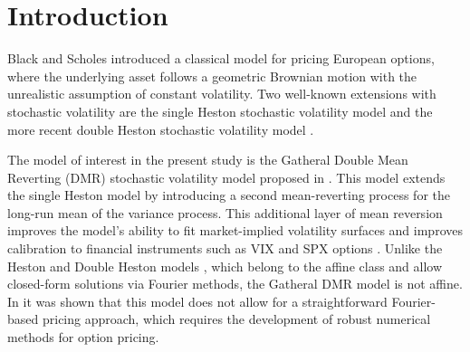 \documentclass[graybox]{svmult}
\begin{document}










\section{Introduction}
Black and Scholes \cite{black1973pricing} introduced a classical model for pricing European options, where the underlying asset follows a geometric Brownian motion with the unrealistic assumption of constant volatility. Two well-known extensions with stochastic volatility are the single Heston stochastic volatility \cite{heston1993closed} model and the more recent double Heston stochastic volatility model  \cite{christoffersen2009shape}. 

The model of interest in the present study is the Gatheral Double Mean Reverting (DMR) stochastic volatility model proposed in \cite{gatheral2008consistent}. This model extends the single Heston model by introducing a second mean-reverting process for the long-run mean of the variance process. This additional layer of mean reversion improves the model's ability to fit market-implied volatility surfaces and improves calibration to financial instruments such as VIX and SPX options \cite{bayer2013fast}. Unlike the Heston and Double Heston models \cite{christoffersen2009shape}, which belong to the affine class and allow closed-form solutions via Fourier methods, the Gatheral DMR model is not affine. In \cite{albuhayri2021asymptotics} it was shown that this model does not allow for a straightforward Fourier-based pricing approach, which requires the development of robust numerical methods for option pricing.
\end{document}
